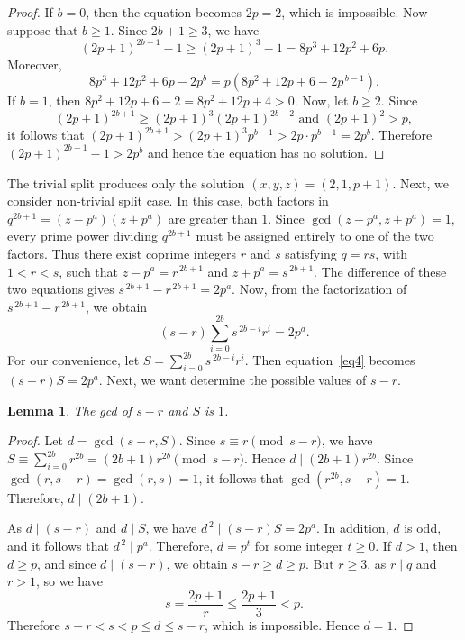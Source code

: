 \documentclass[reqno,12pt]{amsart}
\newtheorem{lemma}[theorem]{Lemma}
\theoremstyle{definition}
\begin{document}
\begin{proof}
If $b=0$, then the equation becomes $2p=2$, which is impossible. Now suppose that $b\ge1$. Since $2b+1\ge3$, we have  
\begin{equation*}
(2p+1)^{2b+1}-1\ge(2p+1)^3-1=8p^3+12p^2+6p.    
\end{equation*}
Moreover,
\begin{equation*}
    8p^3+12p^2+6p-2p^b = p\left(8p^2+12p+6-2p^{\,b-1}\right).
\end{equation*}
If $b=1$, then $8p^2+12p+6-2=8p^2+12p+4>0$. Now, let $b\ge2$. Since
\begin{equation*}
(2p+1)^{2b+1}\ge(2p+1)^3(2p+1)^{2b-2} \,\, \text{and} \,\,  (2p+1)^2>p,   
\end{equation*}
it follows that $(2p+1)^{2b+1}>(2p+1)^3p^{b-1} > 2p \cdot p^{b-1} = 2 p^b $. Therefore $(2p+1)^{2b+1}-1>2p^b$ and hence the equation has no solution.
\end{proof}
The trivial split produces only the solution $(x,y,z)=(2,1,p+1)$. Next, we consider non-trivial split case. 
In this case, both factors in $q^{2b+1}=(z-p^a)(z+p^a)$ are greater than $1$. Since $\gcd(z-p^a,z+p^a)=1$, every prime power dividing $q^{2b+1}$ must be assigned entirely to one of the two factors.
Thus there exist coprime integers $r$ and $s$ satisfying $q=rs$, with $1<r<s$,
such that $z-p^a=r^{\,2b+1}$ and $z+p^a=s^{\,2b+1}$. 
The difference of these two equations gives $s^{\,2b+1}-r^{\,2b+1}=2p^a$. 
Now, from the factorization of $s^{\,2b+1}-r^{\,2b+1}$, we obtain 
\begin{equation}\label{eq4}
(s-r)\sum_{i=0}^{2b}s^{\,2b-i}r^i=2p^a.
\end{equation}
For our convenience, let $\displaystyle S=\sum_{i=0}^{2b}s^{\,2b-i}r^i$. Then equation~\eqref{eq4} becomes $(s-r)S=2p^a$. Next, we want determine the possible values of $s - r$.
\begin{lemma}
\normalfont The gcd of $s-r$ and $S$ is $1$.    
\end{lemma}

\begin{proof}
Let $d=\gcd(s-r,S)$. Since $s\equiv r \pmod{s-r}$,  we have $S\equiv\sum_{i=0}^{2b}r^{2b} =(2b+1)r^{2b} \pmod{s-r}$. 
Hence $d\mid(2b+1)r^{2b}$. Since $\gcd(r,s-r)=\gcd(r,s)=1$, it follows that
$\gcd(r^{2b},s-r)=1$. Therefore, $d\mid(2b+1)$. 

As $d \mid (s-r) $ and $d\mid S$, we have $d^{\,2} \mid (s-r) S = 2 p^a$. In addition, $d$ is odd, and it follows that $d^{\,2}\mid p^a$.
Therefore, $d=p^t$ for some integer $t\ge0$. If $d>1$, then $d\ge p$, and since $d\mid(s-r)$, we obtain $s-r\ge d\ge p$.  But $r \ge 3$, as $r \mid q$ and $r >1$, so we have
\begin{equation*}
s=\frac{2p+1}{r}\le\frac{2p+1}{3}<p.
\end{equation*} 
Therefore $s-r<s<p\le d\le s-r$, which is impossible. Hence $d=1$.
\end{proof}
\end{document}
